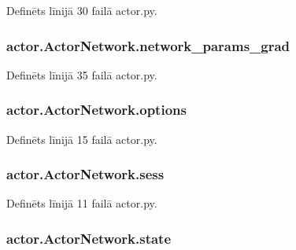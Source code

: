 Definēts līnijā 30 failā actor.\+py.

\subsubsection[{\texorpdfstring{network\+\_\+params\+\_\+grad}{network_params_grad}}]{\setlength{\rightskip}{0pt plus 5cm}actor.\+Actor\+Network.\+network\+\_\+params\+\_\+grad}\hypertarget{classactor_1_1_actor_network_ae6932b19d7a23205226ab1bc454a5693}{}\label{classactor_1_1_actor_network_ae6932b19d7a23205226ab1bc454a5693}


Definēts līnijā 35 failā actor.\+py.

\subsubsection[{\texorpdfstring{options}{options}}]{\setlength{\rightskip}{0pt plus 5cm}actor.\+Actor\+Network.\+options}\hypertarget{classactor_1_1_actor_network_af7cdb447ae7a2a605a9a22336297d34f}{}\label{classactor_1_1_actor_network_af7cdb447ae7a2a605a9a22336297d34f}


Definēts līnijā 15 failā actor.\+py.

\subsubsection[{\texorpdfstring{sess}{sess}}]{\setlength{\rightskip}{0pt plus 5cm}actor.\+Actor\+Network.\+sess}\hypertarget{classactor_1_1_actor_network_ae8daea79f8d1f754c3d44c76036da21a}{}\label{classactor_1_1_actor_network_ae8daea79f8d1f754c3d44c76036da21a}


Definēts līnijā 11 failā actor.\+py.

\subsubsection[{\texorpdfstring{state}{state}}]{\setlength{\rightskip}{0pt plus 5cm}actor.\+Actor\+Network.\+state}\hypertarget{classactor_1_1_actor_network_ab3bae8f52b46f6b7ee7c9f4f0cd21c45}{}\label{classactor_1_1_actor_network_ab3bae8f52b46f6b7ee7c9f4f0cd21c45}


